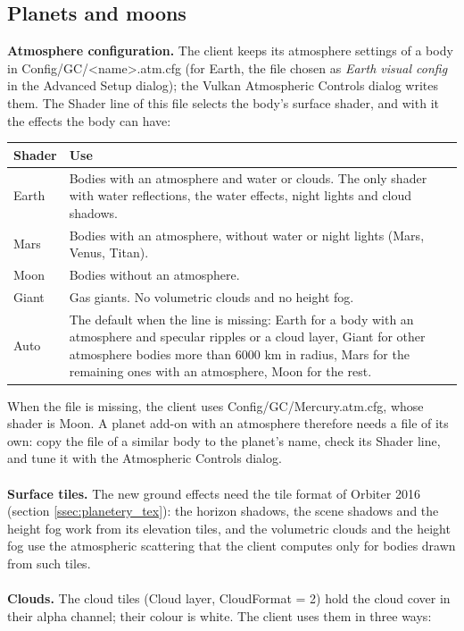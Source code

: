 \documentclass[Orbiter Developer Manual.tex]{subfiles}
\begin{document}
\begin{sloppypar}
\subsection{Planets and moons}
\label{ssec:vk_planets}
\textbf{Atmosphere configuration.} The client keeps its atmosphere settings of a body in Config/GC/<name>.atm.cfg (for Earth, the file chosen as \textit{Earth visual config} in the Advanced Setup dialog); the Vulkan Atmospheric Controls dialog writes them. The Shader line of this file selects the body's surface shader, and with it the effects the body can have:

	\begin{longtable}{ |p{}|p{}| }
	\hline\rule{0pt}{2ex}
	\textbf{Shader} & \textbf{Use}\\
	\hline\rule{0pt}{2ex}
	Earth & Bodies with an atmosphere and water or clouds. The only shader with water reflections, the water effects, night lights and cloud shadows.\\
	\hline\rule{0pt}{2ex}
	Mars & Bodies with an atmosphere, without water or night lights (Mars, Venus, Titan).\\
	\hline\rule{0pt}{2ex}
	Moon & Bodies without an atmosphere.\\
	\hline\rule{0pt}{2ex}
	Giant & Gas giants. No volumetric clouds and no height fog.\\
	\hline\rule{0pt}{2ex}
	Auto & The default when the line is missing: Earth for a body with an atmosphere and specular ripples or a cloud layer, Giant for other atmosphere bodies more than 6000 km in radius, Mars for the remaining ones with an atmosphere, Moon for the rest.\\
	\hline
	\end{longtable}

\noindent
When the file is missing, the client uses Config/GC/Mercury.atm.cfg, whose shader is Moon. A planet add-on with an atmosphere therefore needs a file of its own: copy the file of a similar body to the planet's name, check its Shader line, and tune it with the Atmospheric Controls dialog.\\
\\
\textbf{Surface tiles.} The new ground effects need the tile format of Orbiter 2016 (section \ref{ssec:planetery_tex}): the horizon shadows, the scene shadows and the height fog work from its elevation tiles, and the volumetric clouds and the height fog use the atmospheric scattering that the client computes only for bodies drawn from such tiles.\\
\\
\textbf{Clouds.} The cloud tiles (Cloud layer, CloudFormat = 2) hold the cloud cover in their alpha channel; their colour is white. The client uses them in three ways:


\end{sloppypar}
\end{document}
